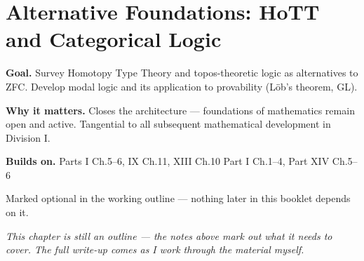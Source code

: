 \chapter{Alternative Foundations: HoTT and Categorical Logic}
\label{ch:14-metamathematics-11}

\begin{chapterintro}
\textbf{Goal.} Survey Homotopy Type Theory and topos-theoretic logic as alternatives to ZFC. Develop modal logic and its application to provability (Löb's theorem, GL).

\textbf{Why it matters.} Closes the architecture — foundations of mathematics remain open and active. Tangential to all subsequent mathematical development in Division I.

\textbf{Builds on.} Parts I Ch.5–6, IX Ch.11, XIII Ch.10 Part I Ch.1–4, Part XIV Ch.5–6
\end{chapterintro}

\begin{remarkbox}
Marked optional in the working outline --- nothing later in this booklet depends on it.
\end{remarkbox}

\textit{This chapter is still an outline --- the notes above mark out what it needs to cover. The full write-up comes as I work through the material myself.}
